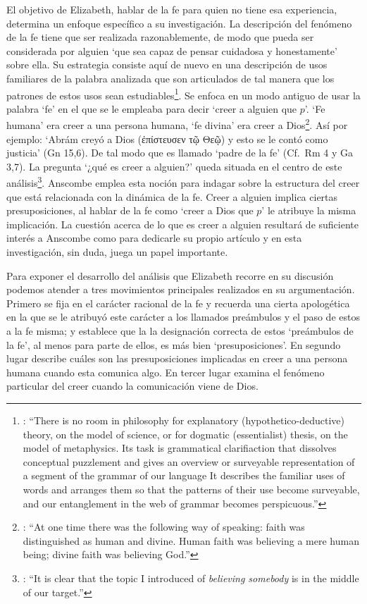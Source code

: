El objetivo de Elizabeth, hablar de la fe para quien no tiene esa experiencia, determina un enfoque específico a su investigación. La descripción del fenómeno de la fe tiene que ser realizada razonablemente, de modo que pueda ser considerada por alguien \enquote*{que sea capaz de pensar cuidadosa y honestamente} sobre ella. Su estrategia consiste aquí de nuevo en una descripción de usos familiares de la palabra analizada que son articulados de tal manera que los patrones de estos usos sean estudiables\footnote{\cite[Cf.~][12]{bakerhacker2009understanding}: \enquote{There is no room in philosophy for explanatory (hypothetico-deductive) theory, on the model of science, or for dogmatic (essentialist) thesis, on the model of metaphysics. Its task is grammatical clarifiaction that dissolves conceptual puzzlement and gives an overview or surveyable representation of a segment of the grammar of our language \textelp{} It describes the familiar uses of words and arranges them so that the patterns of their use become surveyable, and our entanglement in the web of grammar becomes perspicuous.}}. Se enfoca en un modo antiguo de usar la palabra `fe' en el que se le empleaba para decir \enquote*{creer a alguien que $p$}. `Fe humana' era creer a una persona humana, `fe divina' era creer a Dios\footnote{\cite[Cf.~][2]{anscombe2008faith:tobelieve}: \enquote{At one time there was the following way of speaking: faith was distinguished as human and divine. Human faith was believing a mere human being; divine faith was believing God.}}. Así por ejemplo: \enquote*{Abrám creyó a Dios (\textgreek{ἐπίστευσεν τῷ Θεῷ}) y esto se le contó como justicia} (Gn 15,6). De tal modo que es llamado \enquote*{padre de la fe} (Cf.~Rm 4 y Ga 3,7). La pregunta \enquote*{¿qué es creer a alguien?} queda situada en el centro de este análisis\footnote{\cite[Cf.~][116]{anscombe1981erp:faith}: \enquote{It is clear that the topic I introduced of \emph{believing somebody} is in the middle of our target.}}. Anscombe emplea esta noción para indagar sobre la estructura del creer que está relacionada con la dinámica de la fe. Creer a alguien implica ciertas presuposiciones, al hablar de la fe como \enquote*{creer a Dios que $p$} le atribuye la misma implicación. La cuestión acerca de lo que es creer a alguien resultará de suficiente interés a Anscombe como para dedicarle su propio artículo y en esta investigación, sin duda, juega un papel importante.

Para exponer el desarrollo del análisis que Elizabeth recorre en su discusión podemos atender a tres movimientos principales realizados en su argumentación. Primero se fija en el carácter racional de la fe y recuerda una cierta apologética en la que se le atribuyó este carácter a los llamados preámbulos y el paso de estos a la fe misma; y establece que la la designación correcta de estos `preámbulos de la fe', al menos para parte de ellos, es más bien `presuposiciones'. En segundo lugar describe cuáles son las presuposiciones implicadas en creer a una persona humana cuando esta comunica algo. En tercer lugar examina el fenómeno particular del creer cuando la comunicación viene de Dios.

